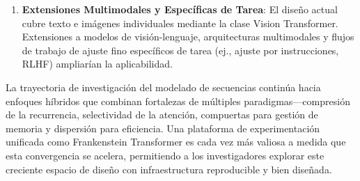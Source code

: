 \begin{enumerate}[leftmargin=*]
    \item \textbf{Extensiones Multimodales y Específicas de Tarea}: El diseño actual cubre texto e imágenes individuales mediante la clase Vision Transformer. Extensiones a modelos de visión-lenguaje, arquitecturas multimodales y flujos de trabajo de ajuste fino específicos de tarea (ej., ajuste por instrucciones, RLHF) ampliarían la aplicabilidad.
\end{enumerate}

La trayectoria de investigación del modelado de secuencias continúa hacia enfoques híbridos que combinan fortalezas de múltiples paradigmas---compresión de la recurrencia, selectividad de la atención, compuertas para gestión de memoria y dispersión para eficiencia. Una plataforma de experimentación unificada como Frankenstein Transformer es cada vez más valiosa a medida que esta convergencia se acelera, permitiendo a los investigadores explorar este creciente espacio de diseño con infraestructura reproducible y bien diseñada.

